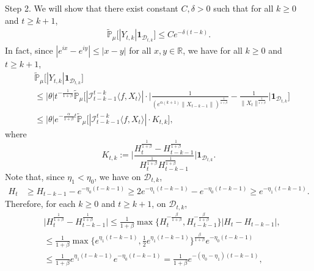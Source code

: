 \documentclass[12pt,a4paper]{amsart}
\theoremstyle{plain}
\theoremstyle{definition}
\numberwithin{equation}{section}
\begin{document}
    Step 2. We will show that there exist constant $C,\delta > 0$ such that for all $k\geq 0$ and $t\geq k+1$,
\begin{equation}\begin{split}
\label{thm122}
     \mathbb{\tilde{P}}_{\mu}\big[|Y_{t,k}|\mathbf{1}_{\mathcal{D}_{t,k}}\big]
     \leq  C e^{-\delta (t-k)}.
\end{split}\end{equation}
    In fact, since $|e^{ix}-e^{iy}|\leq|x-y|$ for all $x,y\in \mathbb R$, we have for all $k \geq 0$ and $t\geq k+1$,
\begin{equation}\begin{split}
\label{eq: control of Ykt}
        &\mathbb{\tilde{P}}_{\mu}\big[|Y_{t,k}|\mathbf{1}_{\mathcal{D}_{t,k}}\big]
        \\&\leq|\theta|t^{-\frac{1}{1+\beta}} \mathbb{\tilde{P}}_{\mu}\bigg[|\mathcal I_{t-k-1}^{t-k}\langle f ,X_t\rangle|\cdot\Big|\frac{1}{(e^{\alpha(k+1)}\|X_{t-k-1}\|)^{\frac{1}{1+\beta}}}-\frac{1}{\|X_t\|^{\frac{1}{1+\beta}}}\Big|\mathbf{1}_{\mathcal{D}_{t,k}}\bigg]
        \\&\leq |\theta| e^{-\frac{\alpha}{1+\beta}t}\mathbb{\tilde{P}}_{\mu}\big[|\mathcal I_{t-k-1}^{t-k}\langle f ,X_t\rangle|\cdot K_{t,k}\big],
\end{split}\end{equation}
    where
\begin{equation}
\label{def: Ktk}
    K_{t,k}
    :=\Big|\frac{H_t^{\frac{1}{1+\beta}}-H_{t-k-1}^{\frac{1}{1+\beta}}}{H_t^{\frac{1}{1+\beta}}H_{t-k-1}^{\frac{1}{1+\beta}}}\Big|\mathbf{1}_{\mathcal{D}_{t,k}}.
\end{equation}
    Note that, since $\eta_1 < \eta_0$, we have on $\mathcal D_{t,k}$, 
\begin{align*}
    H_t
    &\geq H_{t-k-1}- e^{-\eta_0(t-k-1)}
    \geq 2e^{-\eta_1(t-k-1)}-e^{-\eta_0(t-k-1)}
    \geq e^{-\eta_1(t-k-1)}.
\end{align*}
    Therefore, for each $k \geq 0$ and $t\geq k+1$,  on $\mathcal D_{t,k}$, 
\begin{align*}
     &\Big|H_t^{\frac{1}{1+\beta}}-H_{t-k-1}^{\frac{1}{1+\beta}}\Big|
     \leq \frac{1}{1+\beta}\max \Big\{H_t^{-\frac{\beta}{1+\beta}},H_{t-k-1}^{-\frac{\beta}{1+\beta}}\Big\}\left|H_t-H_{t-k-1}\right|,
    \\&\leq \frac{1}{1+\beta} \max\{e^{\eta_1 (t-k-1)}, \frac{1}{2}e^{\eta_1(t-k-1)}\}^{\frac{\beta}{1+\beta}}e^{-\eta_0(t-k-1)}
    \\&\leq \frac{1}{1+\beta} e^{\eta_1 (t-k-1)} e^{-\eta_0(t-k-1)}
    =\frac{1}{1+\beta}  e^{-(\eta_0 - \eta_1)(t-k-1)},
\end{align*}
\end{document}
